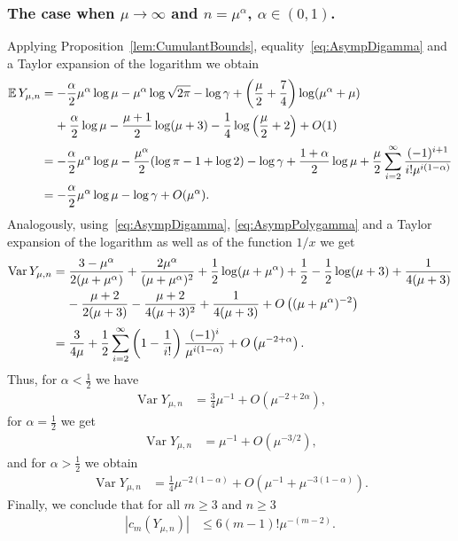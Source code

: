 \documentclass[10pt]{amsart}
\theoremstyle{definition}\newtheorem{defi}[theo]{Definition}\newtheorem{rema}[theo]{Remark}\newtheorem{exam}[theo]{Example}\newtheorem{exem}[theo]{Example}\newtheorem{nota}[theo]{Notation}
\newcommand{\EE}{\mathbb{E}\,}
\newcommand{\Var}{\mathop{\mathrm{Var}}\nolimits}
\begin{document}
\subsubsection{The case when $\mu\rightarrow \infty$ and $n =\mu^{\alpha}$, $\alpha \in (0,1)$.}
Applying Proposition~\ref{lem:CumulantBounds}, equality~\eqref{eq:AsympDigamma} and a Taylor expansion of the logarithm we obtain
\begin{align*}
\EE Y_{\mu,n}&=-\frac{\alpha}{2}\mu^{\alpha}\log \mu-\mu^{\alpha}\log\sqrt{2\pi}-\log\gamma +\left(\frac{\mu}{2}+\frac{7}{4}\right)\log(\mu^{\alpha}+\mu)\\
&\mkern20mu+\frac{\alpha}{2}\log\mu-\frac{\mu+1}{2}\log(\mu+3)-\frac{1}{4}\log\left(\frac{\mu}{2}+2\right)+O(1)\\[0.20em]
&= -\frac{\alpha}{2}\mu^{\alpha}\log \mu-\frac{\mu^{\alpha}}{2}(\log\pi-1+\log 2)-\log\gamma +\frac{1+\alpha}{2}\log\mu+\frac{\mu}{2}\sum\limits_{i=2}^{\infty}\frac{(-1)^{i+1}}{i!\mu^{i(1-\alpha)}}\\
&=-\frac{\alpha}{2}\mu^{\alpha}\log \mu-\log\gamma+O(\mu^{\alpha}).
\end{align*}
Analogously, using~\eqref{eq:AsympDigamma}, \eqref{eq:AsympPolygamma} and a Taylor expansion of the logarithm as well as of the function $1/x$ we get
\begin{align*}
\Var Y_{\mu,n}&=\frac{3-\mu^{\alpha}}{2(\mu+\mu^\alpha)}+\frac{2\mu^{\alpha}}{(\mu+\mu^\alpha)^2}+\frac{1}{2}\log(\mu+\mu^\alpha)+\frac{1}{2}-\frac{1}{2}\log(\mu+3)+\frac{1}{4(\mu+3)}\\
&\mkern20mu-\frac{\mu+2}{2(\mu+3)}-\frac{\mu+2}{4(\mu+3)^2}+\frac{1}{4(\mu+3)}+O\left((\mu+ \mu^{\alpha})^{-2}\right)\\[0.20em]
&=\frac{3}{4\mu}+\frac{1}{2}\sum\limits_{i=2}^{\infty}\left(1-\frac{1}{i!}\right)\frac{(-1)^i}{\mu^{i(1-\alpha)}}+ O\left(\mu^{-2+\alpha}\right).
\end{align*}
Thus, for $\alpha<\frac{1}{2}$ we have
\begin{align*}
\Var Y_{\mu,n}&=\frac{3}{4}\mu^{-1}+ O\left(\mu^{-2+2\alpha}\right),
\end{align*}
for $\alpha=\frac{1}{2}$ we get
\begin{align*}
\Var Y_{\mu,n}&=\mu^{-1}+ O\left(\mu^{-3/2}\right),
\end{align*}
and for $\alpha>\frac{1}{2}$ we obtain
\begin{align*}
\Var Y_{\mu,n}&=\frac{1}{4}\mu^{-2(1-\alpha)}+ O\left(\mu^{-1}+\mu^{-3(1-\alpha)}\right).
\end{align*}
Finally, we conclude that for all $m\geq 3$ and $n\geq 3$
\begin{align*}
|c_m(Y_{\mu,n})|&\leq 6(m-1)!\mu^{-(m-2)}.
\end{align*}
\end{document}
